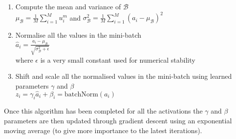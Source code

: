 {{\begin{enumerate}
    \item Compute the mean and variance of $\mathcal{B}$\\
    $\mu_\mathcal{B} = \frac{1}{M} \sum_{i=1}^{M} u_i^m$ 
    \+ \+ \+ and \+ \+ \+
    $\sigma_\mathcal{B}^2 = \frac{1}{M}\sum_{i=1}^M (a_i - \mu_\mathcal{B})^2$
    \item Normalise all the values in the mini-batch\\
    $\hat a_i = \frac{a_i - \mu_\mathcal{B}}{\sqrt{\sigma_\mathcal{B}^2 + \epsilon}}$\\
    where $\epsilon$ is a very small constant used for numerical stability
    \item Shift and scale all the normalised values in the mini-batch using learned parameters $\gamma$ and $\beta$\\
    $z_i = \gamma_i \hat a_i + \beta_i = \text{batchNorm}(a_i)$
\end{enumerate}

Once this algorithm has been completed for all the activations the $\gamma$ and $\beta$ parameters are then updated through gradient descent using an exponential moving average (to give more importance to the latest iterations).

}}
